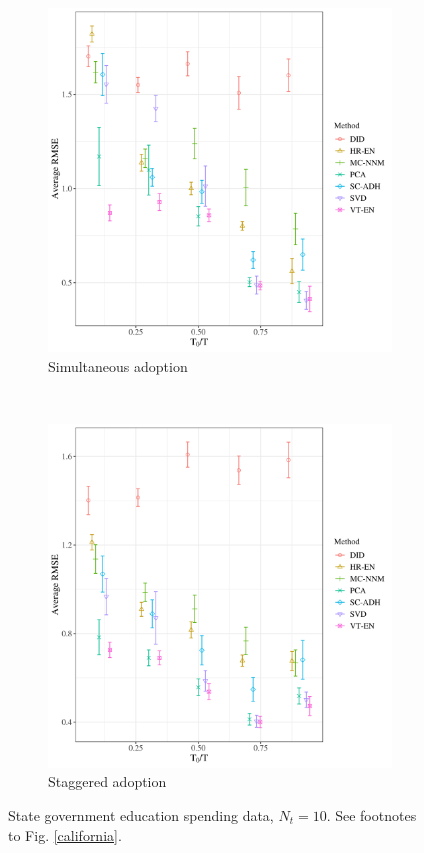 \documentclass[12pt]{article}
\begin{document}
\begin{figure}[htbp]
	\centering
	\begin{subfigure}[t]{0.45\textwidth}
		\centering
		\includegraphics[width=\textwidth]{plots/educ_pc_N_19_T_156_numruns_20_num_treated_10_simultaneuous_1.png}
		\caption{Simultaneous adoption} 
	\end{subfigure}
	~ 
	\begin{subfigure}[t]{0.45\textwidth}
		\centering
		\includegraphics[width=\textwidth]{plots/educ_pc_N_19_T_156_numruns_20_num_treated_10_simultaneuous_0.png}
		\caption{Staggered adoption}
	\end{subfigure}
	\caption{State government education spending data, $N_t = 10$. See footnotes to Fig. \ref{california}. \label{educ-pc}} 
\end{figure}
\end{document}
